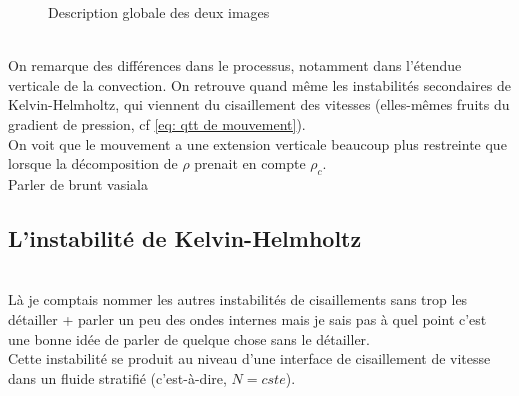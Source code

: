 \documentclass{rapportECC}
\begin{document}
\begin{figure}[H]
    \centering
    \hfill
    \caption{Description globale des deux images}
    \label{fig:images_cote_a_cote}
\end{figure}
\\
On remarque des différences dans le processus, notamment dans l'étendue verticale de la convection. On retrouve quand même les instabilités secondaires de Kelvin-Helmholtz, qui viennent du cisaillement des vitesses (elles-mêmes fruits du gradient de pression, cf \eqref{eq: qtt de mouvement}).
\\
On voit que le mouvement a une extension verticale beaucoup plus restreinte que lorsque la décomposition de $\rho$ prenait en compte $\rho_c$.
\\
Parler de brunt vasiala

\subsection{L'instabilité de Kelvin-Helmholtz}
\label{KHI}
\\
Là je comptais nommer les autres instabilités de cisaillements sans trop les détailler + parler un peu des ondes internes mais je sais pas à quel point c'est une bonne idée de parler de quelque chose sans le détailler.
\\
Cette instabilité se produit au niveau d'une interface de cisaillement de vitesse dans un fluide stratifié (c'est-à-dire, $N = cste$). \\
\end{document}
